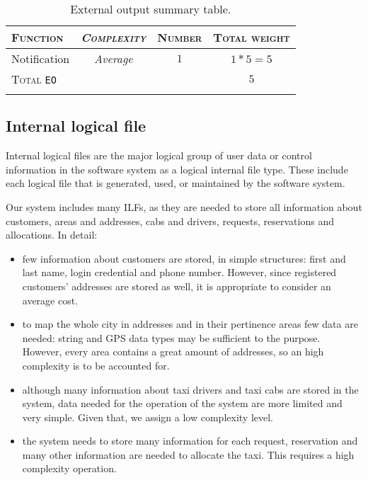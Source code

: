 \begin{table*}\begin{tabularx}{\textwidth}{ X >{\itshape}C{\myWFP} C{\myWFP} C{\myWFP} }

\toprule
	
	\normalfont\textsc{Function} &
	\normalfont\textsc{Complexity}	& 
	\normalfont\textsc{Number} &
	\normalfont\textsc{Total weight} \\

\toprule

	Notification	& Average		& $ 1 $		& $ 1*5 = 5 $ \\

\bottomrule

\normalfont\textsc{Total} \texttt{EO} && & $ 5 $ \\
\bottomrule

\caption{External output summary table.}

\label{tab:eo}\end{tabularx}\end{table*}



\subsection*{Internal logical file}

Internal logical files are the major logical group of user data or control information in the software system as a logical internal file type. These include each logical file that is generated, used, or maintained by the software system.

Our system includes many ILFs, as they are needed to store all information about customers, areas and addresses, cabs and drivers, requests, reservations and allocations. In detail:

\begin{itemize}
	\item few information about customers are stored, in simple structures: first and last name, login credential and phone number. However, since registered customers' addresses are stored as well, it is appropriate to consider an average cost.
	\item to map the whole city in addresses and in their pertinence areas few data are needed: string and GPS data types may be sufficient to the purpose. However, every area contains a great amount of addresses, so an high complexity is to be accounted for.
	\item although many information about taxi drivers and taxi cabs are stored in the system, data needed for the operation of the system are more limited and very simple. Given that, we assign a low complexity level.
	\item the system needs to store many information for each request, reservation and many other information are needed to allocate the taxi. This requires a high complexity operation.
\end{itemize}






